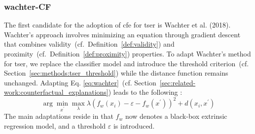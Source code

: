 \subsubsection{\gls{wachter}-CF}
\label{sec:methods:wachter}
The first candidate for the adoption of \gls{cfe} for \gls{tser}  is Wachter et al. \cite{wachter_counterfactual_2018} (2018). Wachter's approach involves minimizing an equation through gradient descent that combines validity~(cf.~Definition~\ref{def:validity}) and proximity~(cf.~Definition~\ref{def:proximity}) properties. To adapt Wachter's method for \gls{tser}, we replace the classifier model and introduce the threshold criterion~(cf. Section~\ref{sec:methods:tser_threshold}) while the distance function remains unchanged.
Adapting Eq. \ref{eq:wachter}~(cf. Section~\ref{sec:related-work:counterfactual_explanations}) leads to the following : 
\begin{equation} \label{eq:wachteR-cf}
\arg \min _{x^{\prime}} \max _{\lambda} \lambda\left(f_{w}\left(x_{i}\right)-\varepsilon -f_{w}\left(x^{\prime}\right)\right)^{2}+d\left(x_{i}, x^{\prime}\right)
\end{equation}
The main adaptations reside in that $f_{w}$ now denotes a black-box extrinsic regression model, and a threshold $\varepsilon$ is introduced. 

